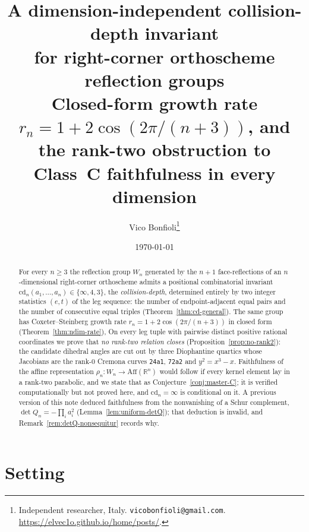 \documentclass[11pt,a4paper]{article}
\title{\textbf{A dimension-independent collision-depth invariant\\
for right-corner orthoscheme reflection groups}\\[0.3em]
\large Closed-form growth rate $r_n = 1 + 2\cos(2\pi/(n+3))$, and the rank-two
obstruction to Class~C faithfulness in every dimension}
\author{Vico Bonfioli\thanks{Independent researcher, Italy.
\texttt{vicobonfioli@gmail.com}.\,
\url{https://elvec1o.github.io/home/posts/}.}}
\date{\today}
\theoremstyle{remark}
\theoremstyle{plain}
\begin{document}
\sloppy
\maketitle

\begin{abstract}
For every $n \ge 3$ the reflection group $W_n$ generated by the
$n+1$ face-reflections of an $n$-dimensional right-corner orthoscheme
admits a positional combinatorial invariant
$\mathrm{cd}_n(a_1, \ldots, a_n) \in \{\infty, 4, 3\}$, the
\emph{collision-depth}, determined entirely by two integer statistics
$(e, t)$ of the leg sequence: the number of endpoint-adjacent equal
pairs and the number of consecutive equal triples (Theorem~\ref{thm:cd-general}).
The same group has Coxeter--Steinberg growth rate
$r_n = 1 + 2\cos(2\pi/(n+3))$ in closed form (Theorem~\ref{thm:ndim-rate}),
On every leg tuple with pairwise distinct positive rational coordinates
we prove that \emph{no rank-two relation closes}
(Proposition~\ref{prop:no-rank2}): the candidate dihedral angles are cut out by
three Diophantine quartics whose Jacobians are the rank-$0$ Cremona curves
\texttt{24a1}, \texttt{72a2} and $y^2=x^3-x$. Faithfulness of the affine
representation $\rho_n : W_n \to \mathrm{Aff}(\mathbb{R}^n)$ would follow if
every kernel element lay in a rank-two parabolic, and we state that as
Conjecture~\ref{conj:master-C}; it is verified computationally but not proved
here, and $\mathrm{cd}_n = \infty$ is conditional on it. A previous version of
this note deduced faithfulness from the nonvanishing of a Schur complement,
$\det Q_n = -\prod_i a_i^2$ (Lemma~\ref{lem:uniform-detQ}); that deduction is
invalid, and Remark~\ref{rem:detQ-nonsequitur} records why.
\end{abstract}

\section{Setting}\label{sec:setting}
\end{document}
